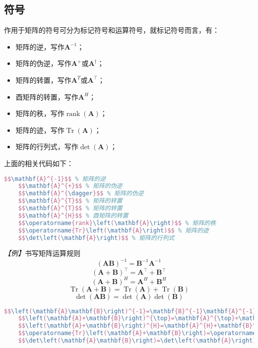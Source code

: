 \subsection{符号}
作用于矩阵的符号可分为标记符号和运算符号，就标记符号而言，有：
\begin{itemize}
    \item 矩阵的逆，写作$\mathbf{A}^{-1}$；
    \item 矩阵的伪逆，写作$\mathbf{A}^{+}$或$\mathbf{A}^{\dagger}$；
    \item 矩阵的转置，写作$\mathbf{A}^{T}$或$\mathbf{A}^{\top}$；
    \item 酉矩阵的转置，写作$\mathbf{A}^{H}$；
    \item 矩阵的秩，写作$\operatorname{rank}\left(\mathbf{A}\right)$；
    \item 矩阵的迹，写作$\operatorname{Tr}\left(\mathbf{A}\right)$；
    \item 矩阵的行列式，写作$\det\left(\mathbf{A}\right)$；
\end{itemize}
上面的相关代码如下：
\begin{lstlisting}[language=TeX]
    $$\mathbf{A}^{-1}$$ % 矩阵的逆
    $$\mathbf{A}^{+}$$ % 矩阵的伪逆
    $$\mathbf{A}^{\dagger}$$ % 矩阵的伪逆
    $$\mathbf{A}^{T}$$ % 矩阵的转置
    $$\mathbf{A}^{T}$$ % 矩阵的转置
    $$\mathbf{A}^{H}$$ % 酉矩阵的转置
    $$\operatorname{rank}\left(\mathbf{A}\right)$$ % 矩阵的秩
    $$\operatorname{Tr}\left(\mathbf{A}\right)$$ % 矩阵的迹
    $$\det\left(\mathbf{A}\right)$$ % 矩阵的行列式
\end{lstlisting}

\emph{【例】}书写矩阵运算规则
$$\left(\mathbf{A}\mathbf{B}\right)^{-1}=\mathbf{B}^{-1}\mathbf{A}^{-1}$$
$$\left(\mathbf{A}+\mathbf{B}\right)^{\top}=\mathbf{A}^{\top}+\mathbf{B}^{\top}$$
$$\left(\mathbf{A}+\mathbf{B}\right)^{H}=\mathbf{A}^{H}+\mathbf{B}^{H}$$
$$\operatorname{Tr}\left(\mathbf{A}+\mathbf{B}\right)=\operatorname{Tr}\left(\mathbf{A}\right)+\operatorname{Tr}\left(\mathbf{B}\right)$$
$$\det\left(\mathbf{A}\mathbf{B}\right)=\det\left(\mathbf{A}\right)\det\left(\mathbf{B}\right)$$
\begin{lstlisting}[language=TeX]
    $$\left(\mathbf{A}\mathbf{B}\right)^{-1}=\mathbf{B}^{-1}\mathbf{A}^{-1}$$
    $$\left(\mathbf{A}+\mathbf{B}\right)^{\top}=\mathbf{A}^{\top}+\mathbf{B}^{\top}$$
    $$\left(\mathbf{A}+\mathbf{B}\right)^{H}=\mathbf{A}^{H}+\mathbf{B}^{H}$$
    $$\operatorname{Tr}\left(\mathbf{A}+\mathbf{B}\right)=\operatorname{Tr}\left(\mathbf{A}\right)+\operatorname{Tr}\left(\mathbf{B}\right)$$
    $$\det\left(\mathbf{A}\mathbf{B}\right)=\det\left(\mathbf{A}\right)\det\left(\mathbf{B}\right)$$
\end{lstlisting}

